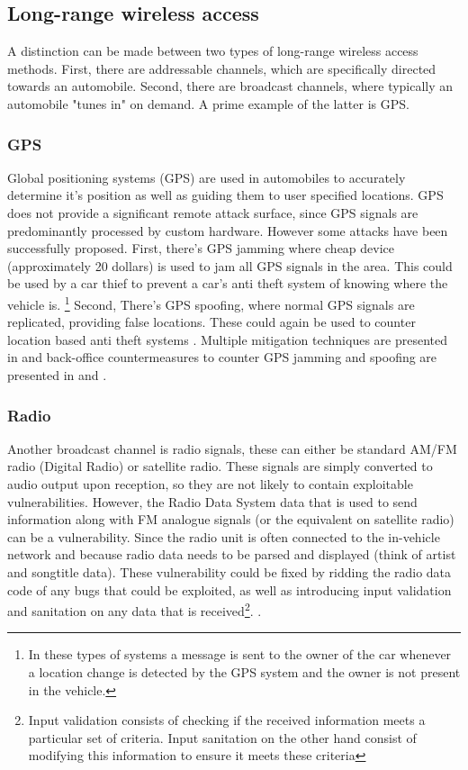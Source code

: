 \subsection{Long-range wireless access}
\label{subsec:lone-range_wireless_access}

A distinction can be made between two types of long-range wireless access methods. First, there are addressable channels, which are specifically directed towards an automobile. Second, there are broadcast channels, where typically an automobile "tunes in" on demand. A prime example of the latter is GPS.

\subsubsection{GPS} 
\label{subsubsec:gps}

Global positioning systems (GPS) are used in automobiles to accurately determine it's position as well as guiding them to user specified locations. GPS does not provide a significant remote attack surface, since GPS signals are predominantly processed by custom hardware\cite{Kosher}. However some attacks have been successfully proposed. First, there's GPS jamming where cheap device (approximately 20 dollars) is used to jam all GPS signals in the area. This could be used by a car thief to prevent a car's anti theft system of knowing where the vehicle is. \footnote{In these types  of systems a message is sent to the owner of the car whenever a location change is detected by the GPS system and the owner is not present in the vehicle.} Second, There's GPS spoofing, where normal GPS signals are replicated, providing false locations. These could again be used to counter location based anti theft systems \cite{Petit}. Multiple mitigation techniques are presented in \cite{GPS1} and back-office countermeasures to counter GPS jamming and spoofing are presented in \cite{GPS2} and \cite{GPS3}. 

\subsubsection{Radio} 
\label{subsubsec:radio}

Another broadcast channel is radio signals, these can either be standard AM/FM radio (Digital Radio) or satellite radio. These signals are simply converted to audio output upon reception, so they are not likely to contain exploitable vulnerabilities. However, the Radio Data System data that is used to send information along with FM analogue signals (or the equivalent on satellite radio) can be a vulnerability. Since the radio unit is often connected to the in-vehicle network and because radio data needs to be parsed and displayed (think of artist and songtitle data). These vulnerability could be fixed by ridding the radio data code of any bugs that could be exploited, as well as introducing input validation and sanitation on any data that is received\footnote{Input validation consists of checking if the received information meets a particular set of criteria. Input sanitation on the other hand consist of modifying this information to ensure it meets these criteria}. \cite{MillerA}\cite{MillerD}\cite{Kosher}. 

